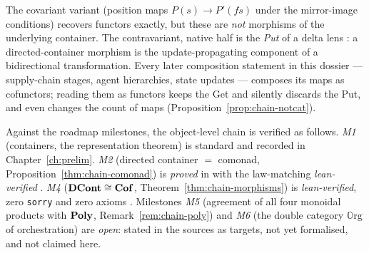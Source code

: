 \begin{remark}\label{rem:chain-lens}
The covariant variant (position maps $P(s)\to P'(fs)$ under the mirror-image
conditions) recovers functors exactly, but these are \emph{not} morphisms of the
underlying container. The contravariant, native half is the \emph{Put} of a delta
lens \cite{Clarke20}: a directed-container morphism is the update-propagating
component of a bidirectional transformation. Every later composition statement in
this dossier --- supply-chain stages, agent hierarchies, state updates ---
composes its maps as cofunctors; reading them as functors keeps the Get and
silently discards the Put, and even changes the count of maps
(Proposition~\ref{prop:chain-notcat}).
\end{remark}

\begin{remark}\label{rem:chain-status}
Against the roadmap milestones, the object-level chain is verified as follows.
\emph{M1} (containers, the representation theorem) is standard and recorded in
Chapter~\ref{ch:prelim}. \emph{M2} (directed container $=$ comonad,
Proposition~\ref{thm:chain-comonad}) is \emph{proved} in \cite{ACU14} with the
law-matching \emph{lean-verified} \cite{MacBethBase}. \emph{M4}
($\mathbf{DCont}\cong\mathbf{Cof}$, Theorem~\ref{thm:chain-morphisms}) is
\emph{lean-verified}, zero \texttt{sorry} and zero axioms \cite{MacBethBase}.
Milestones \emph{M5} (agreement of all four monoidal products with $\mathbf{Poly}$,
Remark~\ref{rem:chain-poly}) and \emph{M6} (the double category $\mathbb O\mathrm{rg}$
of orchestration) are \emph{open}: stated in the sources as targets, not yet
formalised, and not claimed here.
\end{remark}


